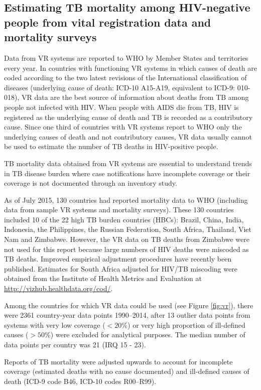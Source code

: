 \subsection{Estimating TB mortality among HIV-negative people from vital registration data and mortality surveys}

Data from VR systems are reported to WHO by Member States and territories every year. In countries with functioning VR systems in which causes of death are coded according to the two latest revisions of the International classification of diseases (underlying cause of death: ICD-10 A15-A19, equivalent to ICD-9: 010-018), VR data are the best source of information about deaths from TB among people not infected with HIV. When people with AIDS die from TB, HIV is registered as the underlying cause of death and TB is recorded as a contributory cause. Since one third of countries with VR systems report to WHO only the underlying causes of death and not contributory causes, VR data usually cannot be used to estimate the number of TB deaths in HIV-positive people. 

TB mortality data obtained from VR systems are essential to understand trends in TB disease burden where case notifications have incomplete coverage or their coverage is not documented through an inventory study. 

As of July 2015, 130 countries had reported mortality data to WHO (including data from sample VR systems and mortality surveys). These 130 countries included 10 of the 22 high TB burden countries (HBCs): Brazil, China, India, Indonesia, the Philippines, the Russian Federation, South Africa, Thailand, Viet Nam and Zimbabwe. However, the VR data on TB deaths from Zimbabwe were not used for this report because large numbers of HIV deaths were miscoded as TB deaths. Improved empirical adjustment procedures have recently been published\cite{21479092}. Estimates for South Africa adjusted for HIV/TB miscoding were obtained from the Institute of Health Metrics and Evaluation at \url{http://vizhub.healthdata.org/cod/}. 

Among the countries for which VR data could be used (see Figure \ref{fig:vr}), there were 2361 country-year data points 1990–2014, after 13 outlier data points from systems with very low coverage ($<20\%$) or very high proportion of ill-defined causes ($>50\%$) were excluded for analytical purposes. The median number of data points per country was 21 (IRQ 15 - 23). 

Reports of TB mortality were adjusted upwards to account for incomplete coverage (estimated deaths with no cause documented) and ill-defined causes of death (ICD-9 code B46, ICD-10 codes R00–R99).\cite{15798840}

